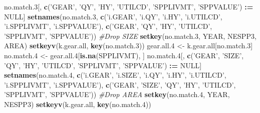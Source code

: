 \documentclass[]{article}
\newenvironment{Shaded}{\begin{snugshade}}{\end{snugshade}}
\newcommand{\KeywordTok}[1]{\textcolor[rgb]{0.13,0.29,0.53}{\textbf{#1}}}
\newcommand{\DecValTok}[1]{\textcolor[rgb]{0.00,0.00,0.81}{#1}}
\newcommand{\StringTok}[1]{\textcolor[rgb]{0.31,0.60,0.02}{#1}}
\newcommand{\CommentTok}[1]{\textcolor[rgb]{0.56,0.35,0.01}{\textit{#1}}}
\newcommand{\OtherTok}[1]{\textcolor[rgb]{0.56,0.35,0.01}{#1}}
\newcommand{\OperatorTok}[1]{\textcolor[rgb]{0.81,0.36,0.00}{\textbf{#1}}}
\newcommand{\ErrorTok}[1]{\textcolor[rgb]{0.64,0.00,0.00}{\textbf{#1}}}
\newcommand{\NormalTok}[1]{#1}
\begin{document}
\begin{Shaded}
\begin{Highlighting}[]
\NormalTok{  no.match.}\DecValTok{3}\NormalTok{[, }\KeywordTok{c}\NormalTok{(}\StringTok{'GEAR'}\NormalTok{, }\StringTok{'QY'}\NormalTok{, }\StringTok{'HY'}\NormalTok{, }\StringTok{'UTILCD'}\NormalTok{, }\StringTok{'SPPLIVMT'}\NormalTok{, }\StringTok{'SPPVALUE'}\NormalTok{) }\OperatorTok{:}\ErrorTok{=}\StringTok{ }\OtherTok{NULL}\NormalTok{]}
  \KeywordTok{setnames}\NormalTok{(no.match.}\DecValTok{3}\NormalTok{, }\KeywordTok{c}\NormalTok{(}\StringTok{'i.GEAR'}\NormalTok{, }\StringTok{'i.QY'}\NormalTok{, }\StringTok{'i.HY'}\NormalTok{, }\StringTok{'i.UTILCD'}\NormalTok{, }\StringTok{'i.SPPLIVMT'}\NormalTok{, }\StringTok{'i.SPPVALUE'}\NormalTok{), }
           \KeywordTok{c}\NormalTok{(}\StringTok{'GEAR'}\NormalTok{, }\StringTok{'QY'}\NormalTok{, }\StringTok{'HY'}\NormalTok{, }\StringTok{'UTILCD'}\NormalTok{, }\StringTok{'SPPLIVMT'}\NormalTok{, }\StringTok{'SPPVALUE'}\NormalTok{))}
  \CommentTok{#Drop SIZE}
  \KeywordTok{setkey}\NormalTok{(no.match.}\DecValTok{3}\NormalTok{, YEAR, NESPP3, AREA)}
  \KeywordTok{setkeyv}\NormalTok{(k.gear.all, }\KeywordTok{key}\NormalTok{(no.match.}\DecValTok{3}\NormalTok{))}
\NormalTok{  gear.all.}\DecValTok{4}\NormalTok{ <-}\StringTok{ }\NormalTok{k.gear.all[no.match.}\DecValTok{3}\NormalTok{]}
\NormalTok{  no.match.}\DecValTok{4}\NormalTok{ <-}\StringTok{ }\NormalTok{gear.all.}\DecValTok{4}\NormalTok{[}\KeywordTok{is.na}\NormalTok{(SPPLIVMT), ]}
\NormalTok{  no.match.}\DecValTok{4}\NormalTok{[, }\KeywordTok{c}\NormalTok{(}\StringTok{'GEAR'}\NormalTok{, }\StringTok{'SIZE'}\NormalTok{, }\StringTok{'QY'}\NormalTok{, }\StringTok{'HY'}\NormalTok{, }\StringTok{'UTILCD'}\NormalTok{, }\StringTok{'SPPLIVMT'}\NormalTok{, }\StringTok{'SPPVALUE'}\NormalTok{) }\OperatorTok{:}\ErrorTok{=}\StringTok{ }\OtherTok{NULL}\NormalTok{]}
  \KeywordTok{setnames}\NormalTok{(no.match.}\DecValTok{4}\NormalTok{, }\KeywordTok{c}\NormalTok{(}\StringTok{'i.GEAR'}\NormalTok{, }\StringTok{'i.SIZE'}\NormalTok{, }\StringTok{'i.QY'}\NormalTok{, }\StringTok{'i.HY'}\NormalTok{, }\StringTok{'i.UTILCD'}\NormalTok{, }\StringTok{'i.SPPLIVMT'}\NormalTok{, }\StringTok{'i.SPPVALUE'}\NormalTok{), }
                       \KeywordTok{c}\NormalTok{(}\StringTok{'GEAR'}\NormalTok{,   }\StringTok{'SIZE'}\NormalTok{,   }\StringTok{'QY'}\NormalTok{,   }\StringTok{'HY'}\NormalTok{,  }\StringTok{'UTILCD'}\NormalTok{,  }\StringTok{'SPPLIVMT'}\NormalTok{, }\StringTok{'SPPVALUE'}\NormalTok{))}
  \CommentTok{#Drop AREA}
  \KeywordTok{setkey}\NormalTok{(no.match.}\DecValTok{4}\NormalTok{, YEAR, NESPP3)}
  \KeywordTok{setkeyv}\NormalTok{(k.gear.all, }\KeywordTok{key}\NormalTok{(no.match.}\DecValTok{4}\NormalTok{))}

\end{Highlighting}
\end{Shaded}
\end{document}
